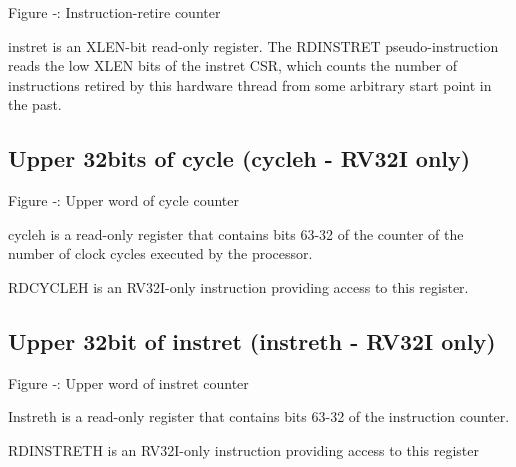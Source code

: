 \missingfigure{}

Figure ‑: Instruction-retire counter

instret is an XLEN-bit read-only register. The RDINSTRET
pseudo-instruction reads the low XLEN bits of the instret CSR, which
counts the number of instructions retired by this hardware thread from
some arbitrary start point in the past.

\subsection{Upper 32bits of cycle (cycleh - RV32I
only)}\label{upper-32bits-of-cycle-cycleh---rv32i-only}

\missingfigure{}

Figure ‑: Upper word of cycle counter

cycleh is a read-only register that contains bits 63-32 of the counter
of the number of clock cycles executed by the processor.

RDCYCLEH is an RV32I-only instruction providing access to this register.

\subsection{Upper 32bit of instret (instreth - RV32I
only)}\label{upper-32bit-of-instret-instreth---rv32i-only}

\missingfigure{}

Figure ‑: Upper word of instret counter

Instreth is a read-only register that contains bits 63-32 of the
instruction counter.

RDINSTRETH is an RV32I-only instruction providing access to this
register